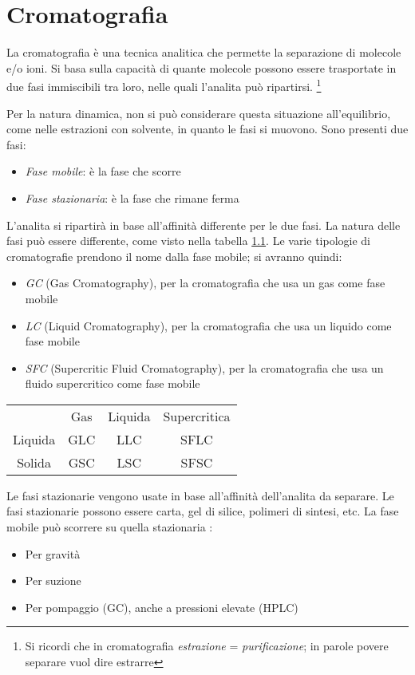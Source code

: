 \chapter{Cromatografia}
La cromatografia è una tecnica analitica che permette la separazione di molecole e/o ioni. Si basa sulla capacità di quante molecole possono essere trasportate in 
due fasi immiscibili tra loro, nelle quali l'analita può ripartirsi. \footnote{Si ricordi che in cromatografia \textit{estrazione} = \textit{purificazione}; in parole povere separare vuol dire estrarre}

Per la natura dinamica, non si può considerare questa situazione all'equilibrio, come nelle estrazioni con solvente, in quanto le fasi si muovono.
Sono presenti due fasi:
\begin{itemize}
\item \emph{Fase mobile}: è la fase che scorre
\item \emph{Fase stazionaria}: è la fase che rimane ferma
\end{itemize}

L'analita si ripartirà in base all'affinità differente per le due fasi.
La natura delle fasi può essere differente, come visto nella tabella \ref{tab:cromatografie}.
Le varie tipologie di cromatografie prendono il nome dalla fase mobile; si avranno quindi:

\begin{itemize}
\item \emph{GC} (Gas Cromatography), per la cromatografia che usa un gas come fase mobile
\item \emph{LC} (Liquid Cromatography), per la cromatografia che usa un liquido come fase mobile
\item \emph{SFC} (Supercritic Fluid Cromatography), per la cromatografia che usa un fluido supercritico come fase mobile
\end{itemize}

\begin{table}
\begin{tabular}{cccc}
 & Gas & Liquida & Supercritica\\
Liquida & GLC & LLC & SFLC\\
Solida & GSC & LSC & SFSC\\
\end{tabular}
\label{tab:cromatografie}
\end{table}

Le fasi stazionarie vengono usate in base all'affinità dell'analita da separare.
Le fasi stazionarie possono essere carta, gel di silice, polimeri di sintesi, etc.
La fase mobile può scorrere su quella stazionaria :
\begin{itemize}
\item Per gravità
\item Per suzione
\item Per pompaggio (GC), anche a pressioni elevate (HPLC)
\end{itemize}

